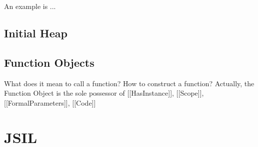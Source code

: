 \documentclass[a4paper,11pt,twoside]{report}
\begin{document}
An example is ... %


\section{Initial Heap}

\section{Function Objects}
What does it mean to call a function?
How to construct a function? 
Actually, the Function Object is the sole possessor of [[HasInstance]], [[Scope]], [[FormalParameters]], [[Code]]

\chapter{JSIL}\label{sec:jsil}
\end{document}
